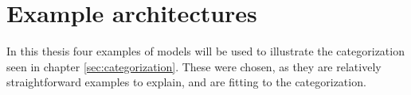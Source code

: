\chapter{Example architectures}


In this thesis four examples of models will be used to illustrate the categorization seen in chapter \autoref{sec:categorization}. These were chosen, as they are relatively straightforward examples to explain, and are fitting to the categorization.



